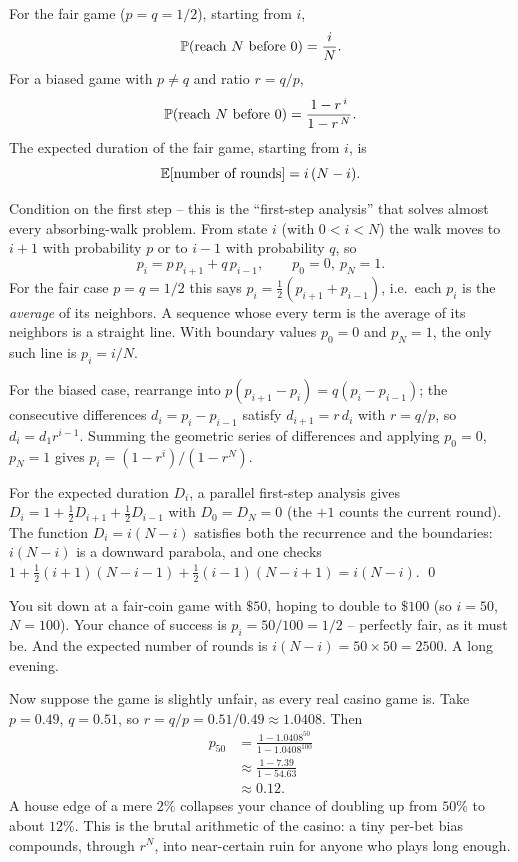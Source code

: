 \begin{theorem}
\label{ch26:thm-ruin}
For the fair game ($p = q = 1/2$), starting from $i$,
\[
  \P(\text{reach } N \text{ before } 0) = \frac{i}{N}.
\]
For a biased game with $p \ne q$ and ratio $r = q/p$,
\[
  \P(\text{reach } N \text{ before } 0) = \frac{1 - r^{\,i}}{1 - r^{\,N}}.
\]
The expected duration of the fair game, starting from $i$, is
\[
  \E[\text{number of rounds}] = i\,(N - i).
\]
\end{theorem}

\begin{whybox}
Condition on the first step -- this is the ``first-step analysis'' that solves
almost every absorbing-walk problem. From state $i$ (with $0 < i < N$) the walk
moves to $i+1$ with probability $p$ or to $i-1$ with probability $q$, so
\[
  p_i = p\,p_{i+1} + q\,p_{i-1}, \qquad p_0 = 0,\ p_N = 1.
\]
For the fair case $p = q = 1/2$ this says $p_i = \tfrac{1}{2}(p_{i+1} +
p_{i-1})$, i.e.\ each $p_i$ is the \emph{average} of its neighbors. A sequence
whose every term is the average of its neighbors is a straight line. With
boundary values $p_0 = 0$ and $p_N = 1$, the only such line is $p_i = i/N$.

For the biased case, rearrange into $p(p_{i+1} - p_i) = q(p_i - p_{i-1})$; the
consecutive differences $d_i = p_i - p_{i-1}$ satisfy $d_{i+1} = r\,d_i$ with
$r = q/p$, so $d_i = d_1 r^{i-1}$. Summing the geometric series of differences
and applying $p_0 = 0$, $p_N = 1$ gives $p_i = (1 - r^i)/(1 - r^N)$.

For the expected duration $D_i$, a parallel first-step analysis gives
$D_i = 1 + \tfrac{1}{2}D_{i+1} + \tfrac{1}{2}D_{i-1}$ with $D_0 = D_N = 0$
(the $+1$ counts the current round). The function $D_i = i(N-i)$ satisfies both
the recurrence and the boundaries: $i(N-i)$ is a downward parabola, and one
checks $1 + \tfrac12(i{+}1)(N{-}i{-}1) + \tfrac12(i{-}1)(N{-}i{+}1) = i(N-i)$.
\qed
\end{whybox}

\begin{example}
\label{ch26:ex-ruin}
You sit down at a fair-coin game with $\$50$, hoping to double to $\$100$
(so $i = 50$, $N = 100$). Your chance of success is $p_i = 50/100 = 1/2$ --
perfectly fair, as it must be. And the expected number of rounds is $i(N-i) =
50 \times 50 = 2500$. A long evening.

Now suppose the game is slightly unfair, as every real casino game is. Take
$p = 0.49$, $q = 0.51$, so $r = q/p = 0.51/0.49 \approx 1.0408$. Then
\begin{align*}
  p_{50} &= \frac{1 - 1.0408^{50}}{1 - 1.0408^{100}} \\
  &\approx \frac{1 - 7.39}{1 - 54.63} \\
  &\approx 0.12.
\end{align*}
A house edge of a mere $2\%$ collapses your chance of doubling up from $50\%$ to
about $12\%$. This is the brutal arithmetic of the casino: a tiny per-bet bias
compounds, through $r^N$, into near-certain ruin for anyone who plays long
enough.
\end{example}

